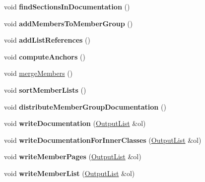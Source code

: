 \begin{DoxyCompactItemize}
\item 
\hypertarget{class_class_def_ad714b0e193e95efc23bb5de8dfb76cb6}{void {\bfseries find\-Sections\-In\-Documentation} ()}\label{class_class_def_ad714b0e193e95efc23bb5de8dfb76cb6}

\item 
\hypertarget{class_class_def_ab9b8dfbf4b834e7f3e6557537a877ed9}{void {\bfseries add\-Members\-To\-Member\-Group} ()}\label{class_class_def_ab9b8dfbf4b834e7f3e6557537a877ed9}

\item 
\hypertarget{class_class_def_a6b28c57cb8b05f6fe38f771e62b9aa17}{void {\bfseries add\-List\-References} ()}\label{class_class_def_a6b28c57cb8b05f6fe38f771e62b9aa17}

\item 
\hypertarget{class_class_def_a6bd971b93180dba29a797a5472362d17}{void {\bfseries compute\-Anchors} ()}\label{class_class_def_a6bd971b93180dba29a797a5472362d17}

\item 
void \hyperlink{class_class_def_a54bb3ccc04cd653fd3056550e5e1ceb4}{merge\-Members} ()
\item 
\hypertarget{class_class_def_a8769ab4803a557422b86e565cb6b30d0}{void {\bfseries sort\-Member\-Lists} ()}\label{class_class_def_a8769ab4803a557422b86e565cb6b30d0}

\item 
\hypertarget{class_class_def_a2422e453d341daa281687fb6a4e7b76f}{void {\bfseries distribute\-Member\-Group\-Documentation} ()}\label{class_class_def_a2422e453d341daa281687fb6a4e7b76f}

\item 
\hypertarget{class_class_def_a0c85f3695c99f7b1aeb762bbdabc8d62}{void {\bfseries write\-Documentation} (\hyperlink{class_output_list}{Output\-List} \&ol)}\label{class_class_def_a0c85f3695c99f7b1aeb762bbdabc8d62}

\item 
\hypertarget{class_class_def_a453fbc9a0e3fa0905bdb3cf8fccea263}{void {\bfseries write\-Documentation\-For\-Inner\-Classes} (\hyperlink{class_output_list}{Output\-List} \&ol)}\label{class_class_def_a453fbc9a0e3fa0905bdb3cf8fccea263}

\item 
\hypertarget{class_class_def_a3ab9294ac3e907a42b200665010f9381}{void {\bfseries write\-Member\-Pages} (\hyperlink{class_output_list}{Output\-List} \&ol)}\label{class_class_def_a3ab9294ac3e907a42b200665010f9381}

\item 
\hypertarget{class_class_def_aad7a56107e2a38608e1eed2479900a2c}{void {\bfseries write\-Member\-List} (\hyperlink{class_output_list}{Output\-List} \&ol)}\label{class_class_def_aad7a56107e2a38608e1eed2479900a2c}


\end{DoxyCompactItemize}
